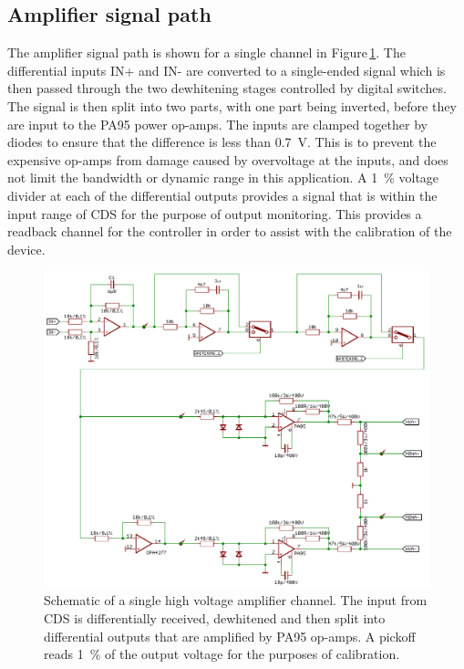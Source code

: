 \subsection{Amplifier signal path}
The amplifier signal path is shown for a single channel in Figure\,\ref{fig:hv-amp-signal-path}. The differential inputs IN+ and IN- are converted to a single-ended signal which is then passed through the two dewhitening stages controlled by digital switches. The signal is then split into two parts, with one part being inverted, before they are input to the PA95 power op-amps. The inputs are clamped together by diodes to ensure that the difference is less than \SI{0.7}{\volt}. This is to prevent the expensive op-amps from damage caused by overvoltage at the inputs, and does not limit the bandwidth or dynamic range in this application. A \SI{1}{\percent} voltage divider at each of the differential outputs provides a signal that is within the input range of \gls{CDS} for the purpose of output monitoring. This provides a readback channel for the controller in order to assist with the calibration of the device.

\begin{figure}
  \centering
  \includegraphics[width=\columnwidth]{graphics/60-hv-amp-signal-path.pdf}
  \caption[High voltage amplifier signal schematic]{\label{fig:hv-amp-signal-path}Schematic of a single high voltage amplifier channel. The input from \gls{CDS} is differentially received, dewhitened and then split into differential outputs that are amplified by PA95 op-amps. A pickoff reads \SI{1}{\percent} of the output voltage for the purposes of calibration.}
\end{figure}

